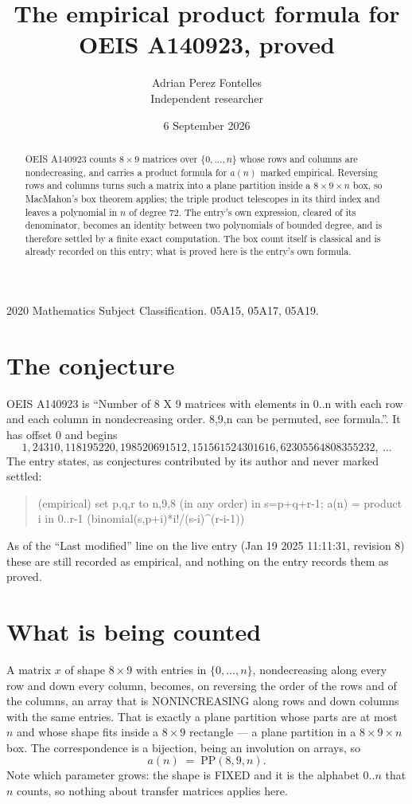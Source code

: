 \documentclass[11pt,a4paper]{article}
\title{The empirical product formula for OEIS A140923, proved}
\author{Adrian Perez Fontelles\\ \small Independent researcher}
\date{6 September 2026}
\theoremstyle{plain}
\theoremstyle{definition}
\begin{document}
\maketitle

\begin{abstract}
OEIS A140923 counts $8\times9$ matrices over $\{0,\dots,n\}$ whose rows and columns are
nondecreasing, and carries a product formula for $a(n)$ marked empirical. Reversing rows and
columns turns such a matrix into a plane partition inside a $8\times9\times n$ box, so
MacMahon's box theorem applies; the triple product telescopes in its third index and leaves a
polynomial in $n$ of degree $72$. The entry's own expression, cleared of its denominator,
becomes an identity between two polynomials of bounded degree, and is therefore settled by a
finite exact computation. The box count itself is classical and is already recorded on this
entry; what is proved here is the entry's own formula.
\end{abstract}

\noindent\small 2020 Mathematics Subject Classification. 05A15, 05A17, 05A19.\normalsize

\section{The conjecture}

OEIS A140923 is ``Number of 8 X 9 matrices with elements in 0..n with each row and each column in nondecreasing order. 8,9,n can be permuted, see formula.''. It has offset $0$ and begins
\[
1, 24310, 118195220, 198520691512, 151561524301616, 62305564808355232,\ \dots
\]
The entry states, as conjectures contributed by its author and never marked settled:
\begin{quote}
(empirical) set p,q,r to n,9,8 (in any order) in s=p+q+r-1; a(n) = product {i in 0..r-1} (binomial(s,p+i)*i!/(s-i)\^{}(r-i-1))

\end{quote}
As of the ``Last modified'' line on the live entry (Jan 19 2025 11:11:31, revision 8) these are still
recorded as empirical, and nothing on the entry records them as proved.

\section{What is being counted}

A matrix $x$ of shape $8\times9$ with entries in $\{0,\dots,n\}$, nondecreasing along
every row and down every column, becomes, on reversing the order of the rows and of the
columns, an array that is NONINCREASING along rows and down columns with the same entries. That
is exactly a plane partition whose parts are at most $n$ and whose shape fits inside a
$8\times9$ rectangle --- a plane partition in a $8\times9\times n$ box. The
correspondence is a bijection, being an involution on arrays, so
\[
a(n)\;=\;\mathrm{PP}(8,9,n).
\]
Note which parameter grows: the shape is FIXED and it is the alphabet $0..n$ that $n$ counts,
so nothing about transfer matrices applies here.
\end{document}
